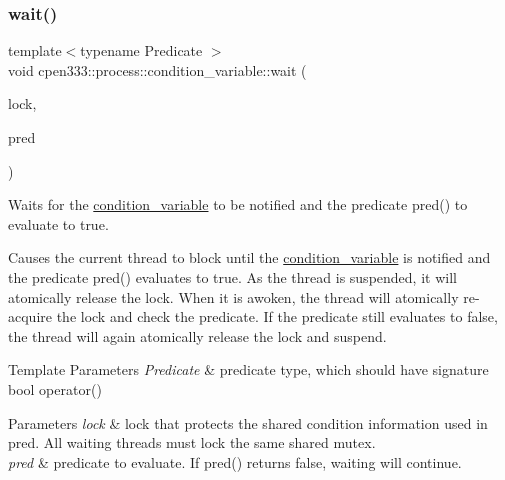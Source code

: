 \subsubsection{\texorpdfstring{wait()}{wait()}\hspace{0.1cm}{\footnotesize\ttfamily [2/2]}}
{\footnotesize\ttfamily template$<$typename Predicate $>$ \\
void cpen333\+::process\+::condition\+\_\+variable\+::wait (\begin{DoxyParamCaption}\item[{std\+::unique\+\_\+lock$<$ \hyperlink{classcpen333_1_1process_1_1mutex}{cpen333\+::process\+::mutex} $>$ \&}]{lock,  }\item[{Predicate}]{pred }\end{DoxyParamCaption})\hspace{0.3cm}{\ttfamily [inline]}}



Waits for the \hyperlink{classcpen333_1_1process_1_1condition__variable}{condition\+\_\+variable} to be notified and the predicate {\ttfamily pred()} to evaluate to {\ttfamily true}. 

Causes the current thread to block until the \hyperlink{classcpen333_1_1process_1_1condition__variable}{condition\+\_\+variable} is notified and the predicate {\ttfamily pred()} evaluates to true. As the thread is suspended, it will atomically release the lock. When it is awoken, the thread will atomically re-\/acquire the lock and check the predicate. If the predicate still evaluates to {\ttfamily false}, the thread will again atomically release the lock and suspend.


\begin{DoxyTemplParams}{Template Parameters}
{\em Predicate} & predicate type, which should have signature {\ttfamily bool operator()} \\
\hline
\end{DoxyTemplParams}

\begin{DoxyParams}{Parameters}
{\em lock} & lock that protects the shared condition information used in {\ttfamily pred}. All waiting threads must lock the same shared mutex. \\
\hline
{\em pred} & predicate to evaluate. If {\ttfamily pred()} returns {\ttfamily false}, waiting will continue. \\
\hline
\end{DoxyParams}
\mbox{\label{classcpen333_1_1process_1_1condition__variable_a9cbaf88e2c000a78be14536cbaff9bf8}} 
